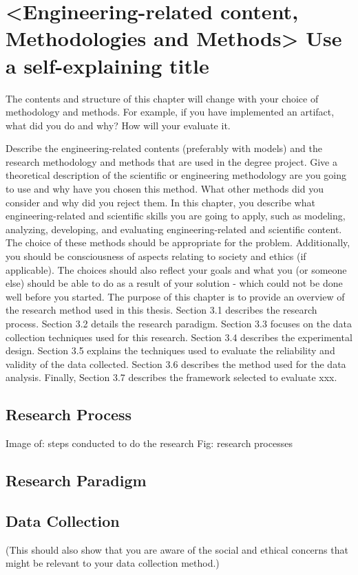 \documentclass[a4paper,10pt,twocolumn]{article}
\numberwithin{figure}{section}
\numberwithin{table}{section}
\begin{document}
\section{<Engineering-related content, Methodologies and Methods>
Use a self-explaining title}

The contents and structure of this chapter will change with your choice of methodology and methods.
For example, if you have implemented an artifact, what did you do and why? How will your evaluate it.


Describe the engineering-related contents (preferably with models) and the research methodology
and methods that are used in the degree project.
Give a theoretical description of the scientific or engineering methodology are you going to use
and why have you chosen this method. What other methods did you consider and why did you reject
them.
In this chapter, you describe what engineering-related and scientific skills you are going to
apply, such as modeling, analyzing, developing, and evaluating engineering-related and scientific
content. The choice of these methods should be appropriate for the problem. Additionally, you
should be consciousness of aspects relating to society and ethics (if applicable). The choices should
also reflect your goals and what you (or someone else) should be able to do as a result of your
solution - which could not be done well before you started.
The purpose of this chapter is to provide an overview of the research method used in this thesis.
Section 3.1 describes the research process. Section 3.2 details the research paradigm. Section 3.3
focuses on the data collection techniques used for this research. Section 3.4 describes the
experimental design. Section 3.5 explains the techniques used to evaluate the reliability and validity
of the data collected. Section 3.6 describes the method used for the data analysis. Finally, Section 3.7
describes the framework selected to evaluate xxx.

\subsection{Research Process}
Image of: steps conducted to do the research 
Fig: research processes


\subsection{Research Paradigm}

\subsection{Data Collection}
(This should also show that you are aware of the social and ethical concerns that might be relevant
to your data collection method.)
\end{document}
